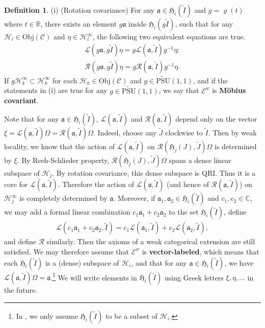 \documentclass[12pt,a4paper]{article}
\theoremstyle{definition}
\newtheorem{df}{Definition}[subsection]
\theoremstyle{plain}
\newcommand{\fk}{\mathfrak}
\newcommand{\mc}{\mathcal}
\newcommand{\wtd}{\widetilde}
\newcommand{\UPSU}{\widetilde{\mathrm{PSU}}(1,1)}
\newcommand{\scr}{\mathscr}
\newcommand{\mbb}{\mathbb}
\newcommand{\Obj}{\mathrm{Obj}}
\numberwithin{equation}{subsection}
\begin{document}
\begin{df}
	(i) (Rotation covariance) 	For any $\fk a\in\fk H_i(\wtd I)$ and $g=\varrho(t)$ where $t\in\mbb R$, there exists an element $g\fk a$ inside $\fk H_i(g\wtd I)$, such that for any $\mc H_l\in\Obj(\scr C)$ and $\eta\in\mc H_l^\infty$, the following two equivalent equations are true.
	\begin{gather}
	\mc L(g\fk a,g\wtd I)\eta=g\mc L(\fk a,\wtd I)g^{-1}\eta;\label{eq27}\\
	\mc R(g\fk a,g\wtd I)\eta=g\mc R(\fk a,\wtd I)g^{-1}\eta.\label{eq28}
	\end{gather}
If $g\mc H_k^\infty\subset\mc H_k^\infty$ for each $\mc H_k\in\Obj(\scr C)$ and $g\in\UPSU$, and if the statements in (i) are true for any $g\in\UPSU$, we say that $\scr E^w$ is \textbf{M\"obius covariant}.
\end{df}


Note that for any $\fk a\in\fk H_i(\wtd I)$, $\mc L(\fk a,\wtd I)$ and $\mc R(\fk a,\wtd I)$ depend only on the vector $\xi=\mc L(\fk a,\wtd I)\Omega=\mc R(\fk a,\wtd I)\Omega$. Indeed, choose any $\wtd J$ clockwise to $\wtd I$. Then by weak locality, we know that the action of $\mc L(\fk a,\wtd I)$ on $\mc R(\fk H_j(J),\wtd J)\Omega$  is determined by $\xi$. By Reeh-Schlieder property, $\mc R(\fk H_j(J),\wtd J)\Omega$ spans a dense linear subspace of $\mc H_j$. By rotation covariance, this dense subspace is QRI. Thus it is a core for $\mc L(\fk a,\wtd I)$. Therefore the action of $\mc L(\fk a,\wtd I)$ (and hence of $\mc R(\fk a,\wtd I)$) on $\mc H_j^\infty$ is completely determined by $\fk a$. Moreover, if $\fk a_1,\fk a_2\in\fk H_i(\wtd I)$ and $c_1,c_2\in\mbb C$, we may add a formal linear combination $c_1\fk a_1+c_2\fk a_2$ to the set $\fk H_i(\wtd I)$, define
\begin{align*}
\mc L(c_1\fk a_1+c_2\fk a_2,\wtd I)=c_1\mc L(\fk a_1,\wtd I)+c_2\mc L(\fk a_2,\wtd I),
\end{align*}
and define $\mc R$ similarly. Then the axioms of a weak categorical extension are still satisfied. We may therefore assume that $\scr E^w$ is \textbf{vector-labeled}, which means that each $\fk H_i(\wtd I)$ is a (dense) subspace of $\mc H_i$, %
and that for any $\fk a\in\fk H_i(\wtd I)$, we have $\mc L(\fk a,\wtd I)\Omega=\fk a$.\footnote{In \cite{Gui21a}, we only assume $\fk H_i(\wtd I)$ to be a subset of $\mc H_i$.} We will write elements in $\fk H_i(\wtd I)$ using Greek letters $\xi,\eta,\dots$ in the future.
\end{document}
